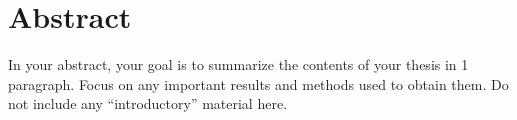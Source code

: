\chapter*{Abstract}
In your abstract, your goal is to summarize the contents of your thesis in 1 paragraph. Focus on any important results and methods used to obtain them. Do not include any ``introductory'' material here.